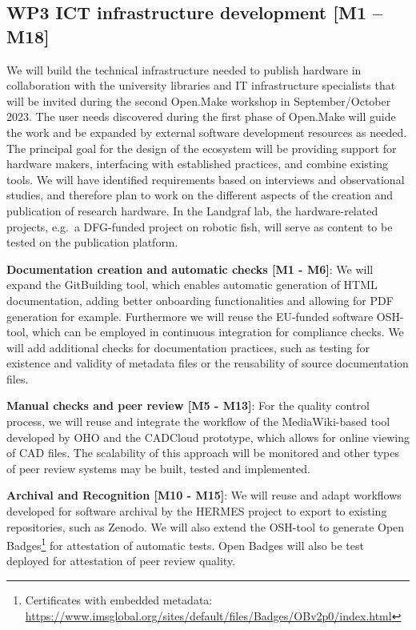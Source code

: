 \documentclass[
  12pt,
  a4paper,
]{article}
\begin{document}
\hypertarget{wp3-ict-infrastructure-development-m1-m18}{%
\subsection{WP3 ICT infrastructure development {[}M1 --
M18{]}}\label{wp3-ict-infrastructure-development-m1-m18}}

We will build the technical infrastructure needed to publish hardware in
collaboration with the university libraries and IT infrastructure
specialists that will be invited during the second Open.Make workshop in
September/October 2023. The user needs discovered during the first phase
of Open.Make will guide the work and be expanded by external software
development resources as needed. The principal goal for the design of
the ecosystem will be providing support for hardware makers, interfacing
with established practices, and combine existing tools. We will have
identified requirements based on interviews and observational studies,
and therefore plan to work on the different aspects of the creation and
publication of research hardware. In the Landgraf lab, the
hardware-related projects, e.g.~a DFG-funded project on robotic fish,
will serve as content to be tested on the publication platform.

\textbf{Documentation creation and automatic checks {[}M1 - M6{]}}: We
will expand the GitBuilding tool, which enables automatic generation of
HTML documentation, adding better onboarding functionalities and
allowing for PDF generation for example. Furthermore we will reuse the
EU-funded software OSH-tool, which can be employed in continuous
integration for compliance checks. We will add additional checks for
documentation practices, such as testing for existence and validity of
metadata files or the reusability of source documentation files.

\textbf{Manual checks and peer review {[}M5 - M13{]}}: For the quality
control process, we will reuse and integrate the workflow of the
MediaWiki-based tool developed by OHO and the CADCloud prototype, which
allows for online viewing of CAD files. The scalability of this approach
will be monitored and other types of peer review systems may be built,
tested and implemented.

\textbf{Archival and Recognition {[}M10 - M15{]}}: We will reuse and
adapt workflows developed for software archival by the HERMES project to
export to existing repositories, such as Zenodo. We will also extend the
OSH-tool to generate Open Badges\footnote{Certificates with embedded
  metadata:
  \url{https://www.imsglobal.org/sites/default/files/Badges/OBv2p0/index.html}}
for attestation of automatic tests. Open Badges will also be test
deployed for attestation of peer review quality.
\end{document}
